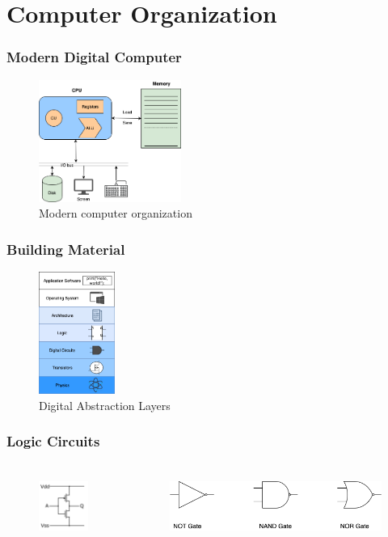 \documentclass{beamer}
\begin{document}
\section{Computer Organization}

\begin{frame}
\frametitle{Modern Digital Computer}
\begin{figure}[h!]
  \includegraphics[height=4cm]{img/computer_organization.png}
    \caption{Modern computer organization}
\end{figure}
\end{frame}

\begin{frame}
\frametitle{Building Material}
\begin{figure}[h!]
  \includegraphics[height=4cm]{img/digital_abstraction.png}
    \caption{Digital Abstraction Layers}
\end{figure}
\end{frame}

\begin{frame}
\frametitle{Logic Circuits}
\begin{columns}
\begin{figure}[h!]
  \includegraphics[height=2cm]{img/CMOS_inverter.png}
\end{figure}
\begin{figure}[h!]
  \includegraphics[height=2cm]{img/basic_gates.png}
\end{figure}
\end{columns}
\end{frame}
\end{document}

